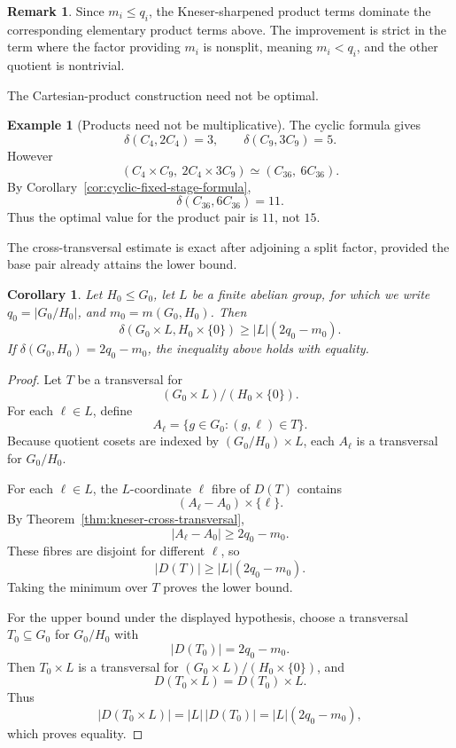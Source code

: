 \documentclass[reqno]{amsart}
\numberwithin{equation}{section}
\newtheorem{corollary}[theorem]{Corollary}
\theoremstyle{definition}
\newtheorem{example}[theorem]{Example}
\newtheorem{remark}[theorem]{Remark}
\begin{document}
\begin{remark}
Since $m_i\leq q_i$, the Kneser-sharpened product terms dominate the
corresponding elementary product terms above.  The improvement is strict in the term where the factor providing
$m_i$ is nonsplit, meaning $m_i<q_i$, and the other quotient is nontrivial.
\end{remark}

The Cartesian-product construction need not be optimal.
\begin{example}[Products need not be multiplicative]
\label{ex:products-not-multiplicative}
The cyclic formula gives
\[
  \delta(C_4,2C_4)=3,
  \qquad
  \delta(C_9,3C_9)=5.
\]
However
\[
  (C_4\times C_9,\ 2C_4\times 3C_9)
  \simeq
  (C_{36},\ 6C_{36}).
\]
By Corollary~\ref{cor:cyclic-fixed-stage-formula},
\[
  \delta(C_{36},6C_{36})=11.
\]
Thus the optimal value for the product pair is $11$, not $15$.
\end{example}

The cross-transversal estimate is exact after adjoining a split factor, provided
the base pair already attains the lower bound.
\begin{corollary}
\label{cor:adjoining-split-factor}
Let $H_0\leq G_0$, let $L$ be a finite abelian group, for which we write
$q_0=|G_0/H_0|$,
and
  $m_0=m(G_0,H_0)$.
Then
\[
  \delta(G_0\times L,H_0\times\{0\})
  \geq
  |L|(2q_0-m_0).
\]
If $\delta(G_0,H_0)=2q_0-m_0$,
the inequality above holds with equality.
\end{corollary}

\begin{proof}
Let $T$ be a transversal for
\[
  (G_0\times L)/(H_0\times\{0\}).
\]
For each $\ell\in L$, define
\[
  A_\ell=\{g\in G_0:(g,\ell)\in T\}.
\]
Because quotient cosets are indexed by $(G_0/H_0)\times L$, each $A_\ell$ is a
transversal for $G_0/H_0$.

For each $\ell\in L$, the $L$-coordinate $\ell$ fibre of $D(T)$ contains
\[
  (A_\ell-A_0)\times\{\ell\}.
\]
By Theorem~\ref{thm:kneser-cross-transversal},
\[
  |A_\ell-A_0|\geq 2q_0-m_0.
\]
These fibres are disjoint for different $\ell$, so
\[
  |D(T)|\geq |L|(2q_0-m_0).
\]
Taking the minimum over $T$ proves the lower bound.

For the upper bound under the displayed hypothesis, choose a transversal
$T_0\subseteq G_0$ for $G_0/H_0$ with
\[
  |D(T_0)|=2q_0-m_0.
\]
Then $T_0\times L$ is a transversal for
$(G_0\times L)/(H_0\times\{0\})$, and
\[
  D(T_0\times L)=D(T_0)\times L.
\]
Thus
\[
  |D(T_0\times L)|=|L|\,|D(T_0)|=|L|(2q_0-m_0),
\]
which proves equality.
\end{proof}
\end{document}
